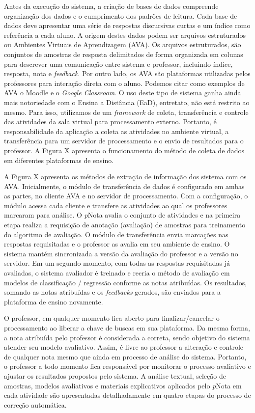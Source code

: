 Antes da execução do sistema, a criação de bases de dados compreende organização dos dados e o cumprimento dos padrões de leitura. Cada base de dados deve apresentar uma série de respostas discursivas curtas e um índice como referência a cada aluno. A origem destes dados podem ser arquivos estruturados ou Ambientes Virtuais de Aprendizagem (AVA). Os arquivos estruturados, são conjuntos de amostras de resposta delimitados de forma organizada em colunas para descrever uma comunicação entre sistema e professor, incluindo índice, resposta, nota e \textit{feedback}. Por outro lado, os AVA são plataformas utilizadas pelos professores para interação direta com o aluno. Podemos citar como exemplos de AVA o Moodle e o \textit{Google Classroom}. O uso deste tipo de sistema ganha ainda mais notoriedade com o Ensina a Distância (EaD), entretato, não está restrito ao mesmo. Para isso, utilizamos de um \textit{framework} de coleta, transferência e controle das atividades da sala virtual para processamento externo. Portanto, é responsabilidade da aplicação a coleta as atividades no ambiente virtual, a transferência para um servidor de processamento e o envio de resultados para o professor. A Figura X apresenta o funcionamento do método de coleta de dados em diferentes plataformas de ensino.


A Figura X apresenta os métodos de extração de informação dos sistema com os AVA. Inicialmente, o módulo de transferência de dados é configurado em ambas as partes, no cliente AVA e no servidor de processamento. Com a configuração, o módulo acessa cada cliente e transfere as atividades ao qual os professores marcaram para análise. O \textit{p}Nota avalia o conjunto de atividades e na primeira etapa realiza a requisição de anotação (avaliação) de amostras para treinamento do algoritmo de avaliação. O módulo de transferência envia marcações nas respostas requisitadas e o professor as avalia em seu ambiente de ensino. O sistema mantém sincronizada a versão da avaliação do professor e a versão no servidor. Em um segundo momento, com todas as respostas requisitadas já avaliadas, o sistema avaliador é treinado e recria o método de avaliação em modelos de classificação / regressão conforme as notas atribuídas. Os resultados, somando as notas atribuídas e os \textit{feedbacks} gerados, são enviados para a plataforma de ensino novamente.

O professor, em qualquer momento fica aberto para finalizar/cancelar o processamento ao liberar a chave de buscas em sua plataforma. Da mesma forma, a nota atribuída pelo professor é considerada a correta, sendo objetivo do sistema atender seu modelo avaliativo. Assim, é livre ao professor a alteração e controle de qualquer nota mesmo que ainda em processo de análise do sistema. Portanto, o professor a todo momento fica responsável por monitorar o processo avaliativo e ajustar os resultados propostos pelo sistema. A análise textual, seleção de amostras, modelos avaliativos e materiais explicativos aplicados pelo \textit{p}Nota em cada atividade são apresentadas detalhadamente em quatro etapas do processo de correção automática.

